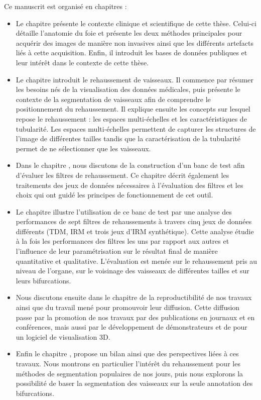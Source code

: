 Ce manuscrit est organisé en \chapTotal{} chapitres : 

\begin{itemize}
\item Le chapitre \chapContextN{} présente le contexte clinique et scientifique de cette thèse. Celui-ci détaille l'anatomie du foie et présente les deux méthodes principales pour acquérir des images de manière non invasives ainsi que les différents artefacts liés à cette acquisition. Enfin, il introduit les bases de données publiques et leur intérêt dans le contexte de cette thèse.

\item Le chapitre \chapSOTAN{} introduit le rehaussement de vaisseaux. Il commence par résumer les besoins nés de la visualisation des données médicales, puis présente le contexte de la segmentation de vaisseaux afin de comprendre le positionnement du rehaussement. Il explique ensuite les concepts sur lesquel repose le rehaussement : les espaces multi-échelles et les caractéristiques de tubularité. Les espaces multi-échelles permettent de capturer les structures de l'image de différentes tailles tandis que la caractérisation de la tubularité permet de ne sélectionner que les vaisseaux.

\item Dans le chapitre \chapBenchN, nous discutons de la construction d'un banc de test afin d'évaluer les filtres de rehaussement. Ce chapitre décrit également les traitements des jeux de données nécessaires à l'évaluation des filtres et les choix qui ont guidé les principes de fonctionnement de cet outil.

\item Le chapitre \chapAnalysisN{} illustre l'utilisation de ce banc de test par une analyse des performances de sept filtres de rehaussements à travers cinq jeux de données différents (TDM, IRM et trois jeux d'IRM synthétique). Cette analyse étudie à la fois les performances des filtres les uns par rapport aux autres et l'influence de leur paramétrisation sur le résultat final de manière quantitative et qualitative. L'évaluation est menée sur le rehaussement pris au niveau de l'organe, sur le voisinage des vaisseaux de différentes tailles et sur leurs bifurcations. 

\item Nous discutons ensuite dans le chapitre \chapReproN{} de la reproductibilité de nos travaux ainsi que du travail mené pour promouvoir leur diffusion. Cette diffusion passe par la promotion de nos travaux par des publications en journaux et en conférences, mais aussi par le développement de démonstrateurs et de \plugIns{} pour un logiciel de visualisation 3D.

\item Enfin le chapitre \chapEndN, propose un bilan ainsi que des perspectives liées à ces travaux. Nous montrons en particulier l'intérêt du rehaussement pour les méthodes de segmentation populaires de nos jours, puis nous explorons la possibilité de baser la segmentation des vaisseaux sur la seule annotation des bifurcations.
\end{itemize}
    